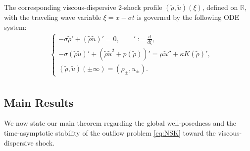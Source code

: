 \documentclass[11pt,reqno]{amsart}
\numberwithin{equation}{section} %
\begin{document}
The corresponding viscous-dispersive 2-shock profile $(\tilde{\rho}, \tilde{u})(\xi)$, defined on $\mathbb{R}$, with the traveling wave variable $\xi = x - \sigma t$ is governed by the following ODE system:
\begin{equation}
\begin{aligned}\label{eq:VCshock}
&\begin{cases}
-\sigma \tilde{\rho}' + (\tilde{\rho} \tilde{u})' = 0,  \qquad  ':= \frac{d}{d\xi},\\
-\sigma (\tilde{\rho} \tilde{u})' +(\tilde{\rho} \tilde{u}^2 + p(\tilde{\rho}))' = \mu \tilde{u}'' + \kappa K(\tilde{\rho})',\\
(\tilde{\rho}, \tilde{u})(\pm\infty)=(\rho_\pm, u_\pm). 
\end{cases}\\
\end{aligned} 
\end{equation}

\subsection{Main Results} 
We now state our main theorem regarding the global well-posedness and the time-asymptotic stability of the outflow problem \eqref{eq:NSK} toward the viscous-dispersive shock.
\end{document}
